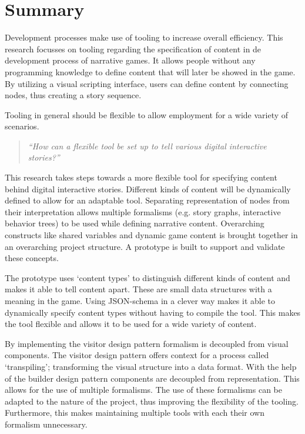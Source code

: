 \chapter*{Summary}
Development processes make use of tooling to increase overall efficiency. This research focusses on tooling regarding the specification of content in de development process of narrative games. It allows people without any programming knowledge to define content that will later be showed in the game. By utilizing a visual scripting interface, users can define content by connecting nodes, thus creating a story sequence.

Tooling in general should be flexible to allow employment for a wide variety of scenarios. 
\begin{quote} 
    \centering
    \large
    \textit{
        “How can a flexible tool be set up to tell various digital interactive stories?”
    }
\end{quote}

\noindent This research takes steps towards a more flexible tool for specifying content behind digital interactive stories. Different kinds of content will be dynamically defined to allow for an adaptable tool. Separating representation of nodes from their interpretation allows multiple formalisms (e.g. story graphs, interactive behavior trees) to be used while defining narrative content. Overarching constructs like shared variables and dynamic game content is brought together in an overarching project structure. A prototype is built to support and validate these concepts.

The prototype uses ‘content types’ to distinguish different kinds of content and makes it able to tell content apart. These are small data structures with a meaning in the game. Using JSON-schema in a clever way makes it able to dynamically specify content types without having to compile the tool. This makes the tool flexible and allows it to be used for a wide variety of content.

By implementing the visitor design pattern formalism is decoupled from visual components. The visitor design pattern offers context for a process called ‘transpiling’; transforming the visual structure into a data format. With the help of the builder design pattern components are decoupled from representation. This allows for the use of multiple formalisms. The use of these formalisms can be adapted to the nature of the project, thus improving the flexibility of the tooling. Furthermore, this makes maintaining multiple tools with each their own formalism unnecessary.

